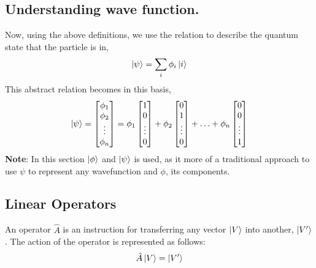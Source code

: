 \documentclass{article}
\begin{document}
\subsection{Understanding wave function.}
\label{subsec:Understanding wave function.}
Now, using the above definitions, we use the relation to describe the quantum state that the particle is in,
\begin{equation}
    \ket{\psi} = \sum_{i}\phi_{i}\ket{i}
\end{equation}
This abstract relation becomes in this basis,
\begin{equation}
    \ket{\psi} = \begin{bmatrix}
        \phi_{1}\\ \phi_{2} \\ \vdots \\ \phi_{n} 
    \end{bmatrix} = \phi_{1} \begin{bmatrix}
        1 \\ 0 \\ \vdots \\ 0
    \end{bmatrix} + \phi_{2} \begin{bmatrix}
        0 \\ 1 \\ \vdots \\ 0
    \end{bmatrix} + \hdots + \phi_{n}\begin{bmatrix}
        0 \\ 0 \\ \vdots \\ 1
    \end{bmatrix}
\end{equation}
\textbf{Note}: In this section $\ket{\phi}$ and $\ket{\psi}$ is used, as it more of a traditional approach to use $\psi$ to represent any wavefunction and $\phi$, its components.

\subsection{Linear Operators}
\label{subsec:Linear Operators}
An operator $\hat{A}$ is an instruction for transferring any vector $\ket{V}$ into another, $\ket{V'}$. The action of the operator is represented as follows:
\begin{equation}
    \hat{A}\ket{V} = \ket{V'}
\end{equation}
\end{document}
